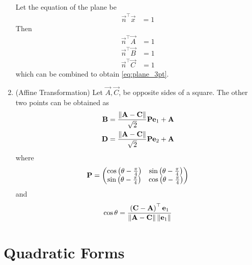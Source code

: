 \documentclass[journal,12pt,twocolumn]{IEEEtran}
\renewcommand\thesection{\arabic{section}}
\renewcommand\thesubsection{\thesection.\arabic{subsection}}
\begin{document}
\begin{enumerate}[label=\thesubsection.\arabic*.,ref=\thesubsection.\theenumi]
\begin{align}
	\label{eq:plane_3pt}
\end{align}
\solution Let the equation of the plane be 
\begin{align}
	\vec{n}^{\top}	\vec{x} &= 1
\end{align}
Then 
\begin{align}
	\vec{n}^{\top}	\vec{A} &= 1
	\\
	\vec{n}^{\top}	\vec{B} &= 1
	\\
	\vec{n}^{\top}	\vec{C} &= 1
\end{align}
which can be combined to obtain 
	\eqref{eq:plane_3pt}.
%
\item (Affine Transformation) Let $\vec{A},\vec{C}$, be opposite sides of a square. The other two points can be obtained as  
\begin{align}
  \label{eq:square_points}
  \mathbf{B} = \frac{\left\lVert\mathbf{A}-\mathbf{C}\right\rVert}{\sqrt{2}} \mathbf{P}\mathbf{e}_1+\mathbf{A}
  \\
  \mathbf{D} = \frac{\left\lVert\mathbf{A}-\mathbf{C}\right\rVert}{\sqrt{2}} \mathbf{P}\mathbf{e}_2+\mathbf{A}
\end{align}
where 
\begin{align}
	\mathbf{P} = \begin{pmatrix}\cos \left(\theta-\frac{\pi}{4}\right) & \sin  \left(\theta-\frac{\pi}{4}\right) \\ \sin \left(\theta-\frac{\pi}{4}\right) & \cos \left(\theta-\frac{\pi}{4}\right)\end{pmatrix}
\end{align}
and 
\begin{align}
	\cos\theta = \frac{\left(\mathbf{C}-\mathbf{A}\right)^{\top}\mathbf{e}_1}{\left\lVert\mathbf{A}-\mathbf{C}\right\rVert\left\lVert\mathbf{e}_1\right\rVert}
\end{align}
\end{enumerate}
\section{Quadratic Forms}
\end{document}
